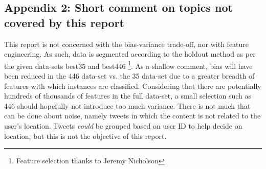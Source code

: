 \documentclass[twocolumn]{article}
\begin{document}
\subsection{Appendix 2: Short comment on topics not covered by this report}
This report is not concerned with the bias-variance trade-off, nor with feature engineering. As such, data is segmented according to the holdout method as per the given data-sets best35 and best446 \footnote{Feature selection thanks to Jeremy Nicholson}. As a shallow comment, bias will have been reduced in the 446 data-set vs. the 35 data-set due to a greater breadth of features with which instances are classified. Considering that there are potentially hundreds of thousands of features in the full data-set, a small selection such as 446 should hopefully not introduce too much variance. There is not much that can be done about noise, namely tweets in which the content is not related to the user's location. Tweets \textit{could} be grouped based on user ID to help decide on location, but this is not the objective of this report.
\end{document}
